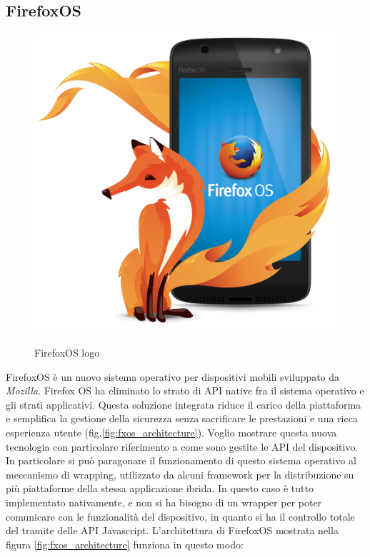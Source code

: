 \subsection{FirefoxOS}

\begin{figure}
	\vspace{-55pt}
	\begin{center}
		\includegraphics[scale=0.075]{Figures/fxos-logo.png}
	\end{center}
	\vspace{0pt}
	\caption{\\FirefoxOS logo}
	\label{fig:fxos_logo}
	\vspace{0pt}
\end{figure}

FirefoxOS è un nuovo sistema operativo per dispositivi mobili sviluppato da \emph{Mozilla}. Firefox OS ha eliminato lo strato di API native fra il sistema operativo e gli strati applicativi. Questa soluzione integrata riduce il carico della piattaforma e semplifica la gestione della sicurezza senza sacrificare le prestazioni e una ricca esperienza utente (fig.\ref{fig:fxos_architecture}). Voglio mostrare questa nuova tecnologia con particolare riferimento a come sono gestite le API del dispositivo. In particolare si può paragonare il funzionamento di questo sistema operativo al meccanismo di wrapping, utilizzato da alcuni framework per la distribuzione su più piattaforme della stessa applicazione ibrida.
In questo caso è tutto implementato nativamente, e non si ha bisogno di un wrapper per poter comunicare con le funzionalità del dispositivo, in quanto si ha il controllo totale del tramite delle API Javascript.
L'architettura di FirefoxOS mostrata nella figura \ref{fig:fxos_architecture} funziona in questo modo:  

